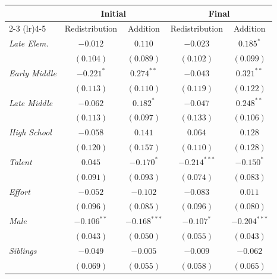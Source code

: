 
\begin{table}[H]
\begin{center}
\begin{footnotesize}
\begin{tabular}{l c c c c}
\toprule
 & \multicolumn{2}{c}{Initial} & \multicolumn{2}{c}{Final} \\
\cmidrule(lr){2-3} \cmidrule(lr){4-5}
 & Redistribution & Addition & Redistribution & Addition \\
\midrule
\textit{Late Elem.}   & $-0.012$      & $0.110$        & $-0.023$       & $0.185^{*}$    \\
                      & $(0.104)$     & $(0.089)$      & $(0.102)$      & $(0.099)$      \\
\textit{Early Middle} & $-0.221^{*}$  & $0.274^{**}$   & $-0.043$       & $0.321^{**}$   \\
                      & $(0.113)$     & $(0.110)$      & $(0.119)$      & $(0.122)$      \\
\textit{Late Middle}  & $-0.062$      & $0.182^{*}$    & $-0.047$       & $0.248^{**}$   \\
                      & $(0.113)$     & $(0.097)$      & $(0.133)$      & $(0.106)$      \\
\textit{High School}  & $-0.058$      & $0.141$        & $0.064$        & $0.128$        \\
                      & $(0.120)$     & $(0.157)$      & $(0.110)$      & $(0.128)$      \\
\textit{Talent}       & $0.045$       & $-0.170^{*}$   & $-0.214^{***}$ & $-0.150^{*}$   \\
                      & $(0.091)$     & $(0.093)$      & $(0.074)$      & $(0.083)$      \\
\textit{Effort}       & $-0.052$      & $-0.102$       & $-0.083$       & $0.011$        \\
                      & $(0.096)$     & $(0.085)$      & $(0.096)$      & $(0.080)$      \\
\textit{Male}         & $-0.106^{**}$ & $-0.168^{***}$ & $-0.107^{*}$   & $-0.204^{***}$ \\
                      & $(0.043)$     & $(0.050)$      & $(0.055)$      & $(0.043)$      \\
\textit{Siblings}     & $-0.049$      & $-0.005$       & $-0.009$       & $-0.062$       \\
                      & $(0.069)$     & $(0.055)$      & $(0.058)$      & $(0.065)$      \\

\end{tabular}
\end{footnotesize}
\end{center}
\end{table}
